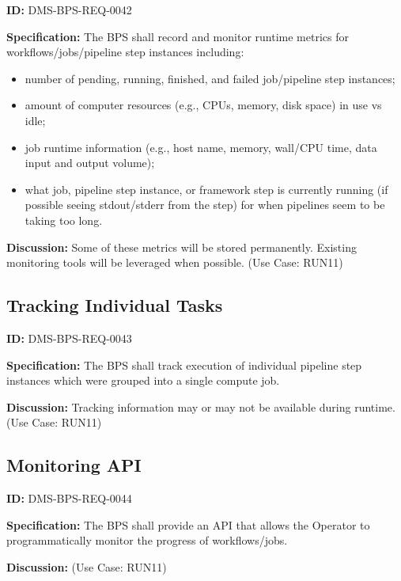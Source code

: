 \documentclass[SE,toc,lsstdraft]{lsstdoc}
\begin{document}
\label{DMS-BPS-REQ-0042}
\textbf{ID:} DMS-BPS-REQ-0042

\textbf{Specification:}
The BPS shall record and monitor runtime metrics for workflows/jobs/pipeline step instances including:
\\

    \begin{itemize}
\item
number of pending, running, finished, and failed job/pipeline step instances;

\item
amount of computer resources (e.g., CPUs, memory, disk space) in use vs idle;

\item
job runtime information (e.g., host name, memory, wall/CPU time, data input and output volume);

\item
what job, pipeline step instance, or framework step is currently running (if possible seeing stdout/stderr from the step) for when pipelines seem to be taking too long.

    \end{itemize}

\textbf{Discussion:}
Some of these metrics will be stored permanently. Existing monitoring tools will be leveraged when possible.  (Use Case: RUN11)

\subsection{Tracking Individual Tasks}

\label{DMS-BPS-REQ-0043}
\textbf{ID:} DMS-BPS-REQ-0043

\textbf{Specification:}
The BPS shall track execution of individual pipeline step instances which were grouped into a single compute job.

\textbf{Discussion:}
Tracking information may or may not be available during runtime.  (Use Case: RUN11)

\subsection{Monitoring API}

\label{DMS-BPS-REQ-0044}
\textbf{ID:} DMS-BPS-REQ-0044

\textbf{Specification:}
The BPS shall provide an API that allows the Operator to programmatically monitor the progress of workflows/jobs.

\textbf{Discussion:}
(Use Case: RUN11)
\end{document}
